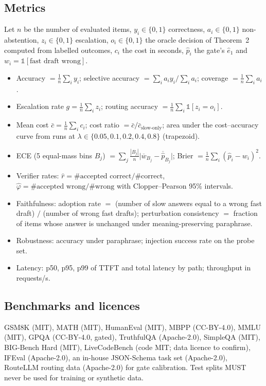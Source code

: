 \documentclass[11pt,a4paper]{article}
\begin{document}
\subsection{Metrics}
Let $n$ be the number of evaluated items, $y_i\in\{0,1\}$ correctness, $a_i\in\{0,1\}$ non-abstention, $z_i\in\{0,1\}$ escalation, $o_i\in\{0,1\}$ the oracle decision of Theorem~2 computed from labelled outcomes, $c_i$ the cost in seconds, $\hat p_i$ the gate's $\hat e_1$ and $w_i=\mathbb 1[\text{fast draft wrong}]$.
\begin{itemize}
\item Accuracy $=\frac1n\sum_i y_i$; selective accuracy $=\sum_i a_iy_i/\sum_i a_i$; coverage $=\frac1n\sum_i a_i$.
\item Escalation rate $g=\frac1n\sum_i z_i$; routing accuracy $=\frac1n\sum_i\mathbb 1[z_i=o_i]$.
\item Mean cost $\bar c=\frac1n\sum_i c_i$; cost ratio $=\bar c/\bar c_{\text{slow-only}}$; area under the cost--accuracy curve from runs at $\lambda\in\{0.05,0.1,0.2,0.4,0.8\}$ (trapezoid).
\item ECE (5 equal-mass bins $B_j$) $=\sum_j\frac{|B_j|}{n}\big|\overline{w}_{B_j}-\overline{\hat p}_{B_j}\big|$; Brier $=\frac1n\sum_i(\hat p_i-w_i)^2$.
\item Verifier rates: $\hat r=\#\text{accepted correct}/\#\text{correct}$, $\hat\varphi=\#\text{accepted wrong}/\#\text{wrong}$ with Clopper--Pearson 95\% intervals.
\item Faithfulness: adoption rate $=$ (number of slow answers equal to a wrong fast draft) $/$ (number of wrong fast drafts); perturbation consistency $=$ fraction of items whose answer is unchanged under meaning-preserving paraphrase.
\item Robustness: accuracy under paraphrase; injection success rate on the probe set.
\item Latency: p50, p95, p99 of TTFT and total latency by path; throughput in requests/s.
\end{itemize}
\subsection{Benchmarks and licences}
GSM8K (MIT), MATH (MIT), HumanEval (MIT), MBPP (CC-BY-4.0), MMLU (MIT), GPQA (CC-BY-4.0, gated), TruthfulQA (Apache-2.0), SimpleQA (MIT), BIG-Bench Hard (MIT), LiveCodeBench (code MIT; data licence to confirm), IFEval (Apache-2.0), an in-house JSON-Schema task set (Apache-2.0), RouteLLM routing data (Apache-2.0) for gate calibration. Test splits MUST never be used for training or synthetic data.
\end{document}
